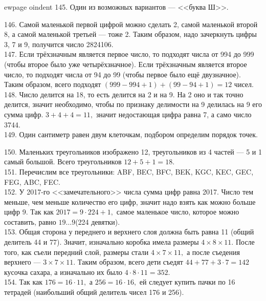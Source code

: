 ewpage
oindent
145. Один из возможных вариантов --- <<буква Ш>>.
\begin{center}
\begin{figure}[ht!]
\end{figure}
\end{center}
146. Самой маленькой первой цифрой можно сделать 2, самой маленькой второй 8, а самой маленькой третьей --- тоже 2. Таким образом, надо зачеркнуть цифры 3, 7 и 9, получится число 2824106.\\
147. Если трёхзначным является первое число, то подходят числа от 994 до 999 (чтобы второе было уже четырёхзначное). Если трёхзначным является второе число, то подходят числа от 94 до 99 (чтобы первое было ещё двузначное). Таким образом, всего подходят $(999-994+1)+(99-94+1)=12$ чисел.\\
148. Число делится на 18, то есть делится на 2 и на 9. На 2 оно и так точно делится, значит необходимо, чтобы по признаку делимости на 9 делилась на 9 его сумма цифр. $3+4+4=11,$ значит недостающая цифра равна 7, а само число 3744.\\
149. Один сантиметр равен двум клеточкам, подбором определим порядок точек.
\begin{center}
\begin{figure}[ht!]
\end{figure}
\end{center}
150. Маленьких треугольников изображено 12, треугольников из 4 частей --- 5 и 1 самый большой. Всего треугольников $12+5+1=18.$\\
151. Перечислим все треугольники: ABF, BEC, BFC, BEK, KGC, KEC, GEC, FEG, ABC, FEC.\\
152. У 2017-го <<замечательного>> числа сумма цифр равна 2017. Число тем меньше, чем меньше количество его цифр, значит надо взять как можно больше цифр 9. Так как
$2017=9\cdot224+1,$ самое маленькое число, которое можно составить, равно $19\ldots9$(224 девятки).\\
153. Общая сторона у переднего и верхнего слоя должна быть равна 11 (общий делитель 44 и 77). Значит, изначально коробка имела размеры $4\times8\times11.$ После того, как съели передний слой, размеры стали $4\times7\times11,$ а после съедения верхнего --- $3\times7\times11.$ Таким образом, всего дети съедят $44+77+3\cdot7=142$ кусочка сахара, а изначально их было $4\cdot8\cdot11=352.$\\
154. Так как $176=16\cdot11,$ а $256=16\cdot16,$ ей следует купить пачки по 16 тетрадей (наибольший общий делитель чисел 176 и 256).\\
